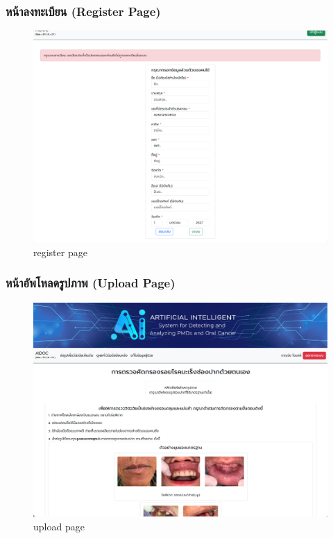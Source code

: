 \subsubsection{หน้าลงทะเบียน (Register Page)}
\begin{figure}[H]
  \centering
  \graphicspath{{./images/}}
  \includegraphics[scale=0.3]{register_patient.png}
  \caption{register page}
  \label{fig:register_patient}
\end{figure}

\subsubsection{หน้าอัพโหลดรูปภาพ (Upload Page)}

\begin{figure}[H]
  \centering
  \graphicspath{{./images/}}
  \includegraphics[scale=0.3]{upload_patient.png}
  \caption{upload page}
  \label{fig:upload_patient}
\end{figure}

